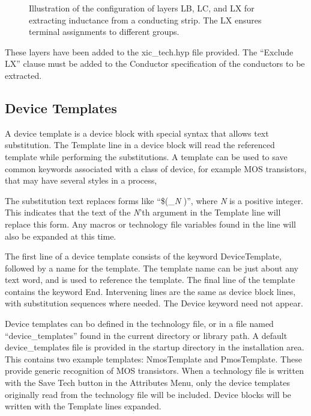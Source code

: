 \begin{figure}
\caption{\label{indx} Illustration of the configuration of layers
LB, LC, and LX for extracting inductance from a conducting strip.
The LX ensures terminal assignments to different groups.}
\vspace{1.5ex}
\begin{center}
\end{center}
\end{figure}

These layers have been added to the {\vt xic\_tech.hyp} file provided. 
The ``{\vt Exclude LX}'' clause must be added to the {\et Conductor}
specification of the conductors to be extracted.


\subsection{Device Templates}

A device template is a device block with special syntax that allows
text substitution.  The {\vt Template} line in a device block will
read the referenced template while performing the substitutions.  A
template can be used to save common keywords associated with a class
of device, for example MOS transistors, that may have several styles
in a process,

The substitution text replaces forms like ``{\vt \$(\_}{\it N\/}{\vt
)}'', where {\it N} is a positive integer.  This indicates that the
text of the {\it N\/}'th argument in the {\vt Template} line will
replace this form.  Any macros or technology file variables found in
the line will also be expanded at this time.

The first line of a device template consists of the keyword {\vt
DeviceTemplate}, followed by a name for the template.  The template
name can be just about any text word, and is used to reference the
template.  The final line of the template contains the keyword {\vt
End}.  Intervening lines are the same as device block lines, with
substitution sequences where needed.  The {\vt Device} keyword need
not appear.

Device templates can bo defined in the technology file, or in a file
named ``{\vt device\_templates}'' found in the current directory or
library path.  A default {\vt device\_templates} file is provided in
the {\vt startup} directory in the installation area.  This contains
two example templates:  {\vt NmosTemplate} and {\vt PmosTemplate}. 
These provide generic recognition of MOS transistors.  When a
technology file is written with the {\cb Save Tech} button in the {\cb
Attributes Menu}, only the device templates originally read from the
technology file will be included.  Device blocks will be written with
the {\vt Template} lines expanded.

